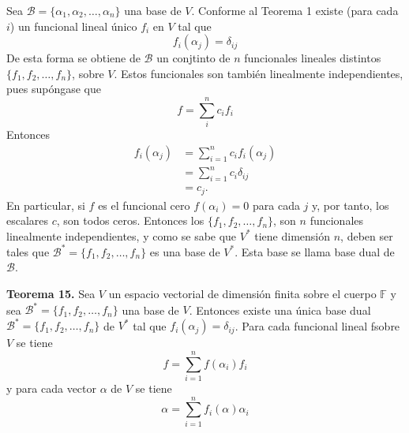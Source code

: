 \newpage

Sea $\mathcal{B}=\{\alpha_{1}, \alpha_{2}, \dots, \alpha_{n}\}$ una base de $V$.
Conforme al Teorema 1 existe (para cada $i$) un funcional lineal único $f_{i}$
en $V$ tal que
\begin{equation}
    f_{i}(\alpha_{j})=\delta_{ij}
\end{equation}
De esta forma se obtiene de $\mathcal{B}$ un conjtinto de $n$ funcionales
lineales distintos $\{f_{1}, f_{2}, \dots, f_{n}\}$, sobre $V$. Estos
funcionales son también linealmente independientes, pues supóngase que
\begin{equation}
    f=\sum_{i}^{n}c_{i}f_{i}
\end{equation}
Entonces
\begin{align*}
    f_{i}(\alpha_{j})&=\sum_{i=1}^{n}c_{i}f_{i}(\alpha_{j})\\
                     &=\sum_{i=1}^{n}c_{i}\delta_{ij}\\
                     &=c_{j}.
\end{align*}
En particular, si $f$ es el funcional cero $f(\alpha_{i}) = 0$ para cada $j$ y,
por tanto, los escalares $c$, son todos ceros. Entonces los
$\{f_{1}, f_{2}, \dots, f_{n}\}$, son $n$ funcionales linealmente
independientes, y como se sabe que $V^\ast$ tiene dimensión $n$,
deben ser tales que $\mathcal{B}^\ast = \{f_{1}, f_{2}, \dots, f_{n}\}$
es una base de $V^\ast$. Esta base se llama base dual de $\mathcal{B}$.

\textbf{Teorema 15.} Sea $V$ un espacio vectorial de dimensión finita
sobre el cuerpo $\mathbb{F}$ y sea $\mathcal{B}^\ast = \{f_{1}, f_{2}, \dots, f_{n}\}$
una base de $V$. Entonces existe una única base dual
$\mathcal{B}^\ast=\{f_{1}, f_{2}, \dots, f_{n}\}$ de $V^\ast$ tal que
$f_{i}(\alpha_{j})=\delta_{ij}$. Para cada funcional lineal fsobre
$V$ se tiene
\begin{equation}
    f=\sum_{i=1}^nf(\alpha_{i})f_{i}
\end{equation}
y para cada vector $\alpha$ de $V$ se tiene
\begin{equation}
    \alpha=\sum_{i=1}^nf_{i}(\alpha)\alpha_{i}
\end{equation}